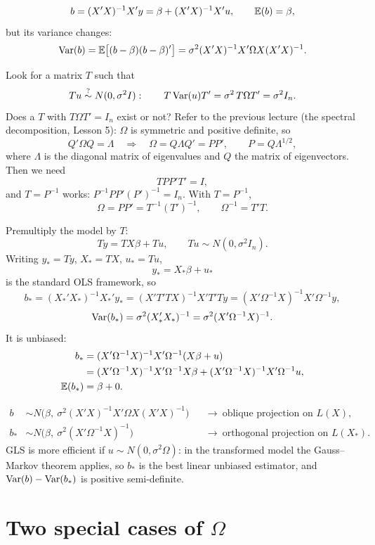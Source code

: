 \documentclass[11pt]{article}
\begin{document}
\[ b = (X'X)^{-1}X'y = \beta + (X'X)^{-1}X'u, \qquad \mathbb{E}(b) = \beta, \]
but its variance changes:
\[ \operatorname{Var}(b) = \mathbb{E}\bigl[(b - \beta)(b - \beta)'\bigr]
   = \sigma^{2}(X'X)^{-1}X'\Omega X(X'X)^{-1}. \]

Look for a matrix $T$ such that
\[ Tu \overset{?}{\sim} N(0, \sigma^{2}I) : \qquad
   T\operatorname{Var}(u)T' = \sigma^{2}\,T\Omega T' = \sigma^{2}I_{n}. \]
Does a $T$ with $T\Omega T' = I_{n}$ exist or not? Refer to the previous lecture (the
spectral decomposition, Lesson 5): $\Omega$ is symmetric and positive definite, so
\[ Q'\Omega Q = \Lambda \quad\Longrightarrow\quad
   \Omega = Q\Lambda Q' = PP', \qquad P = Q\Lambda^{1/2}, \]
where $\Lambda$ is the diagonal matrix of eigenvalues and $Q$ the matrix of
eigenvectors. Then we need
\[ TPP'T' = I, \]
and $T = P^{-1}$ works: $P^{-1}PP'(P')^{-1} = I_{n}$. With $T = P^{-1}$,
\[ \Omega = PP' = T^{-1}(T')^{-1}, \qquad \Omega^{-1} = T'T . \]

Premultiply the model by $T$:
\[ Ty = TX\beta + Tu, \qquad Tu \sim N(0, \sigma^{2}I_{n}). \]
Writing $y_{*} = Ty$, $X_{*} = TX$, $u_{*} = Tu$,
\[ y_{*} = X_{*}\beta + u_{*} \]
is the standard OLS framework, so
\[ b_{*} = (X_{*}'X_{*})^{-1}X_{*}'y_{*} = (X'T'TX)^{-1}X'T'Ty
   = (X'\Omega^{-1}X)^{-1}X'\Omega^{-1}y, \]
\[ \operatorname{Var}(b_{*}) = \sigma^{2}(X_{*}'X_{*})^{-1} = \sigma^{2}(X'\Omega^{-1}X)^{-1}. \]
It is unbiased:
\begin{align*}
  b_{*} &= (X'\Omega^{-1}X)^{-1}X'\Omega^{-1}(X\beta + u)\\
        &= (X'\Omega^{-1}X)^{-1}X'\Omega^{-1}X\beta + (X'\Omega^{-1}X)^{-1}X'\Omega^{-1}u,\\
  \mathbb{E}(b_{*}) &= \beta + 0 .
\end{align*}

\begin{align*}
  b     &\sim N\bigl(\beta,\ \sigma^{2}(X'X)^{-1}X'\Omega X(X'X)^{-1}\bigr)
          &&\longrightarrow\ \text{oblique projection on } L(X),\\
  b_{*} &\sim N\bigl(\beta,\ \sigma^{2}(X'\Omega^{-1}X)^{-1}\bigr)
          &&\longrightarrow\ \text{orthogonal projection on } L(X_{*}).
\end{align*}
GLS is more efficient if $u \sim N(0, \sigma^{2}\Omega)$: in the transformed model
the Gauss--Markov theorem applies, so $b_{*}$ is the best linear unbiased estimator,
and $\operatorname{Var}(b) - \operatorname{Var}(b_{*})$ is positive semi-definite.

\section{Two special cases of $\Omega$}
\end{document}
